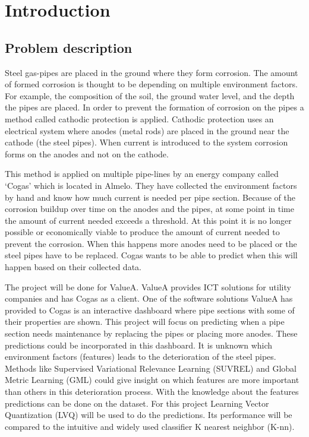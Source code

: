 
\chapter{Introduction}\label{ch:introduction}

\section{Problem description}

Steel gas-pipes are placed in the ground where they form corrosion. The amount of formed corrosion is thought to be depending on multiple environment factors. For example, the composition of the soil, the ground water level, and the depth the pipes are placed. In order to prevent the formation of corrosion on the pipes a method called cathodic protection is applied. Cathodic protection uses an electrical system where anodes (metal rods) are placed in the ground near the cathode (the steel pipes). When current is introduced to the system corrosion forms on the anodes and not on the cathode. 

This method is applied on multiple pipe-lines by an energy company called `Cogas' which is located in Almelo. They have collected the environment factors by hand and know how much current is needed per pipe section. Because of the corrosion buildup over time on the anodes and the pipes, at some point in time the amount of current needed exceeds a threshold. At this point it is no longer possible or economically viable to produce the amount of current needed to prevent the corrosion. When this happens more anodes need to be placed or the steel pipes have to be replaced. Cogas wants to be able to predict when this will happen based on their collected data.

The project will be done for ValueA. ValueA provides ICT solutions for utility companies and has Cogas as a client. One of the software solutions ValueA has provided to Cogas is an interactive dashboard where pipe sections with some of their properties are shown. This project will focus on predicting when a pipe section needs maintenance by replacing the pipes or placing more anodes. These predictions could be incorporated in this dashboard.
It is unknown which environment factors (features) leads to the deterioration of the steel pipes. Methods like Supervised Variational Relevance Learning (SUVREL) and Global Metric Learning (GML) could give insight on which features are more important than others in this deterioration process. With the knowledge about the features predictions can be done on the dataset. For this project Learning Vector Quantization (LVQ) will be used to do the predictions. Its performance will be compared to the intuitive and widely used classifier K nearest neighbor (K-nn).

